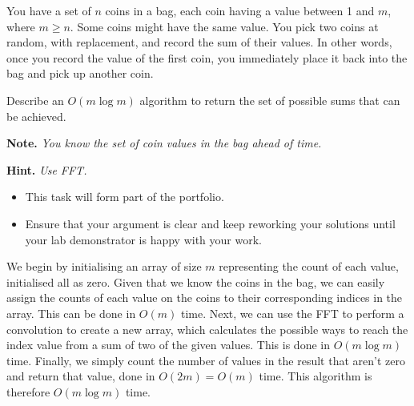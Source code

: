 \documentclass{article}
\begin{document}
\begin{question}
You have a set of $n$ coins in a bag, each coin having a value between 1 and $m$, where $m \geq n$. Some coins might have the same value. You pick two coins at random, with replacement, and record the sum of their values. In other words, once you record the value of the first coin, you immediately place it back into the bag and pick up another coin.

Describe an $O(m \log m)$ algorithm to return the set of possible sums that can be achieved.

{\bfseries Note.} {\em You know the set of coin values in the bag ahead of time.}

{\bfseries Hint.} {\em Use FFT.}
\end{question}

\begin{rubric}
\begin{itemize}
    \item This task will form part of the portfolio.
    \item Ensure that your argument is clear and keep reworking your solutions until your lab demonstrator is happy with your work.
\end{itemize}
\end{rubric}

\begin{solution}
We begin by initialising an array of size $m$ representing the count of each value, initialised all as zero. Given that we know the coins in the bag, we can easily assign the counts of each value on the coins to their corresponding indices in the array. This can be done in $O(m)$ time. Next, we can use the FFT to perform a convolution to create a new array, which calculates the possible ways to reach the index value from a sum of two of the given values. This is done in $O(m \log m)$ time. Finally, we simply count the number of values in the result that aren't zero and return that value, done in $O(2m) = O(m)$ time. This algorithm is therefore $O(m \log m)$ time.
\end{solution}
\end{document}
